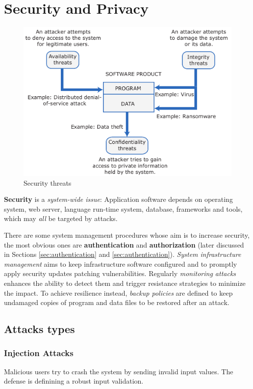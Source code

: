\chapter{Security and Privacy}
\begin{figure}[htbp]
   \centering
   \includegraphics{images/security_threats.png}
   \caption{Security threats}
   \label{fig:security_threats}
\end{figure}
\textbf{Security} is a \textit{system-wide issue}:
Application software depends on operating system, web server, language run-time system, database, frameworks and tools, which may \textit{all} be targeted by attacks.

There are some system management procedures whose aim is to increase security, 
the most obvious ones are \textbf{authentication} and \textbf{authorization} (later discussed in Sections \ref{sec:authentication} and \ref{sec:authentication}).
\textit{System infrastructure management} aims to keep infrastructure software configured
and to promptly apply security updates patching vulnerabilities.
Regularly \textit{monitoring attacks} enhances the ability to detect them and trigger resistance strategies to minimize the impact.
To achieve resilience instead, \textit{backup policies} are defined to keep undamaged copies of program and data files to be restored after an attack.
\section{Attacks types}

\subsection{Injection Attacks}
Malicious users try to crash the system by sending invalid input values.
The defense is definining a robust input validation.

